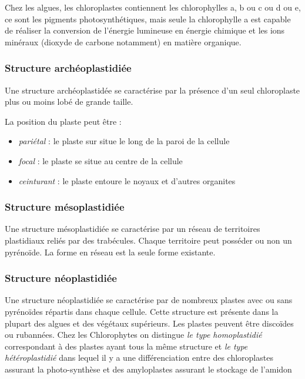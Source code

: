 \documentclass[
]{book}
\providecommand{\tightlist}{%
  \setlength{\itemsep}{0pt}\setlength{\parskip}{0pt}}
\begin{document}
Chez les algues, les chloroplastes contiennent les chlorophylles a, b ou c ou d ou e, ce sont les pigments photosynthétiques, mais seule la chlorophylle a est capable de réaliser la conversion de l'énergie lumineuse en énergie chimique et les ions minéraux (dioxyde de carbone notamment) en matière organique.

\hypertarget{structure-archuxe9oplastidiuxe9e}{%
\subsubsection{Structure archéoplastidiée}\label{structure-archuxe9oplastidiuxe9e}}

Une structure archéoplastidée se caractérise par la présence d'un seul chloroplaste plus ou moins lobé de grande taille.

La position du plaste peut être :

\begin{itemize}
\tightlist
\item
  \emph{pariétal} : le plaste sur situe le long de la paroi de la cellule
\item
  \emph{focal} : le plaste se situe au centre de la cellule
\item
  \emph{ceinturant} : le plaste entoure le noyaux et d'autres organites
\end{itemize}

\hypertarget{structure-muxe9soplastidiuxe9e}{%
\subsubsection{Structure mésoplastidiée}\label{structure-muxe9soplastidiuxe9e}}

Une structure mésoplastidiée se caractérise par un réseau de territoires plastidiaux reliés par des trabécules. Chaque territoire peut posséder ou non un pyrénoïde. La forme en réseau est la seule forme existante.

\hypertarget{structure-nuxe9oplastidiuxe9e}{%
\subsubsection{Structure néoplastidiée}\label{structure-nuxe9oplastidiuxe9e}}

Une structure néoplastidiée se caractérise par de nombreux plastes avec ou sans pyrénoïdes répartis dans chaque cellule. Cette structure est présente dans la plupart des algues et des végétaux supérieurs. Les plastes peuvent être discoïdes ou rubannées.
Chez les Chlorophytes on distingue \emph{le type homoplastidié} correspondant à des plastes ayant tous la même structure et \emph{le type hétéroplastidié} dans lequel il y a une différenciation entre des chloroplastes assurant la photo-synthèse et des amyloplastes assurant le stockage de l'amidon
\end{document}
